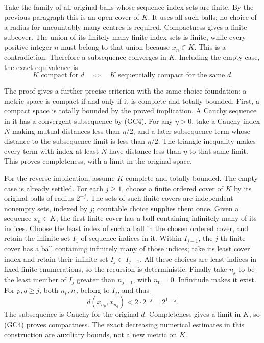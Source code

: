 \documentclass[
  11pt,
]{article}
\begin{document}
Take the family of all original balls whose sequence-index sets are
finite. By the previous paragraph this is an open cover of \(K\). It
uses all such balls; no choice of a radius for uncountably many centres
is required. Compactness gives a finite subcover. The union of its
finitely many finite index sets is finite, while every positive integer
\(n\) must belong to that union because \(x_n\in K\). This is a
contradiction. Therefore a subsequence converges in \(K\). Including the
empty case, the exact equivalence is \[
 K\text{ compact for }d
 \quad\Longleftrightarrow\quad
 K\text{ sequentially compact for the same }d .
 \tag{GC4}
\]

The proof gives a further precise criterion with the same choice
foundation: a metric space is compact if and only if it is complete and
totally bounded. First, a compact space is totally bounded by the proved
implication. A Cauchy sequence in it has a convergent subsequence by
(GC4). For any \(\eta>0\), take a Cauchy index \(N\) making mutual
distances less than \(\eta/2\), and a later subsequence term whose
distance to the subsequence limit is less than \(\eta/2\). The triangle
inequality makes every term with index at least \(N\) have distance less
than \(\eta\) to that same limit. This proves completeness, with a limit
in the original space.

For the reverse implication, assume \(K\) complete and totally bounded.
The empty case is already settled. For each \(j\geq1\), choose a finite
ordered cover of \(K\) by its original balls of radius \(2^{-j}\). The
sets of such finite covers are independent nonempty sets, indexed by
\(j\); countable choice supplies them once. Given a sequence
\(x_n\in K\), the first finite cover has a ball containing infinitely
many of its indices. Choose the least index of such a ball in the chosen
ordered cover, and retain the infinite set \(I_1\) of sequence indices
in it. Within \(I_{j-1}\), the \(j\)-th finite cover has a ball
containing infinitely many of those indices; take its least cover index
and retain their infinite set \(I_j\subset I_{j-1}\). All these choices
are least indices in fixed finite enumerations, so the recursion is
deterministic. Finally take \(n_j\) to be the least member of \(I_j\)
greater than \(n_{j-1}\), with \(n_0=0\). Infinitude makes it exist. For
\(p,q\geq j\), both \(n_p,n_q\) belong to \(I_j\), and thus \[
 d(x_{n_p},x_{n_q})<2\cdot2^{-j}=2^{1-j}.
 \tag{GC5}
\] The subsequence is Cauchy for the original \(d\). Completeness gives
a limit in \(K\), so (GC4) proves compactness. The exact decreasing
numerical estimates in this construction are auxiliary bounds, not a new
metric on \(K\).
\end{document}
